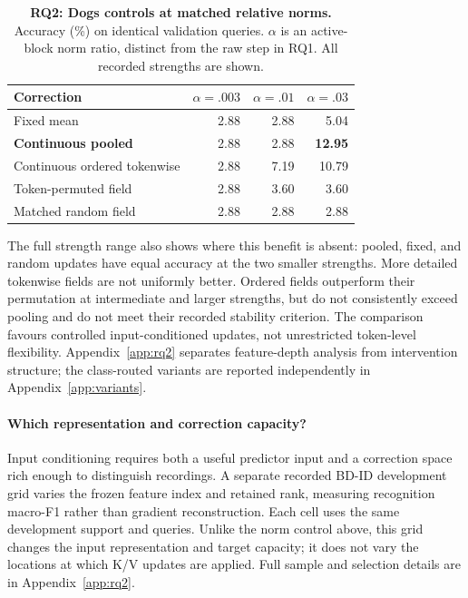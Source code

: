 \documentclass{article}
\begin{document}
\begin{table}[t]
\caption{\textbf{RQ2: Dogs controls at matched relative norms.} Accuracy (\%) on identical validation queries. $\alpha$ is an active-block norm ratio, distinct from the raw step in RQ1. All recorded strengths are shown.}
\label{tab:ablation}
\centering\small
\begin{tabular}{@{}lrrr@{}}
\toprule
Correction & $\alpha=.003$ & $\alpha=.01$ & $\alpha=.03$ \\
\midrule
Fixed mean & 2.88 & 2.88 & 5.04 \\
\textbf{Continuous pooled} & 2.88 & 2.88 & \textbf{12.95} \\
Continuous ordered tokenwise & 2.88 & 7.19 & 10.79 \\
Token-permuted field & 2.88 & 3.60 & 3.60 \\
Matched random field & 2.88 & 2.88 & 2.88 \\
\bottomrule
\end{tabular}
\end{table}

The full strength range also shows where this benefit is absent: pooled, fixed, and random updates have equal accuracy at the two smaller strengths. More detailed tokenwise fields are not uniformly better. Ordered fields outperform their permutation at intermediate and larger strengths, but do not consistently exceed pooling and do not meet their recorded stability criterion. The comparison favours controlled input-conditioned updates, not unrestricted token-level flexibility. Appendix~\ref{app:rq2} separates feature-depth analysis from intervention structure; the class-routed variants are reported independently in Appendix~\ref{app:variants}.


\paragraph{Which representation and correction capacity?}
Input conditioning requires both a useful predictor input and a correction space rich enough to distinguish recordings. A separate recorded BD-ID development grid varies the frozen feature index and retained rank, measuring recognition macro-F1 rather than gradient reconstruction. Each cell uses the same development support and queries. Unlike the norm control above, this grid changes the input representation and target capacity; it does not vary the locations at which K/V updates are applied. Full sample and selection details are in Appendix~\ref{app:rq2}.
\end{document}
